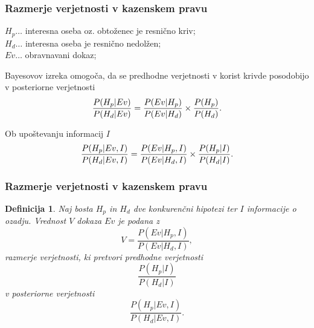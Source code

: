 \documentclass{beamer}
\newtheorem{definicija}{Definicija}
\begin{document}
\begin{frame}
    \frametitle{Razmerje verjetnosti v kazenskem pravu}
    $H_p \dots$ interesna oseba oz. obtoženec je resnično kriv;\\
    $H_d \dots$ interesna oseba je resnično nedolžen;\\
    $Ev \dots$ obravnavani dokaz;\\
    \begin{block}{Bayesovov izreka omogoča, da se predhodne verjetnosti v korist krivde posodobijo v posteriorne verjetnosti}
        \[
            \frac{P(H_p \lvert Ev)}{P(H_d \lvert Ev)} = \frac{P(Ev \lvert H_p)}{P(Ev \lvert H_d)} \times \frac{P(H_p)}{P(H_d)}. \vspace{2mm}
        \]
    \end{block}\vspace{2mm}
    \begin{block}{Ob upoštevanju informacij $I$}
        \[
            \frac{P(H_p \lvert Ev, I)}{P(H_d \lvert Ev, I)} = \frac{P(Ev \lvert H_p, I)}{P(Ev \lvert H_d, I)} \times \frac{P(H_p \lvert I)}{P(H_d \lvert I)}. \vspace{2mm}
        \]
    \end{block}
\end{frame}

\begin{frame}
    \frametitle{Razmerje verjetnosti v kazenskem pravu}
    \begin{definicija}
        Naj bosta  $H_p$ in $H_d$ dve konkurenčni hipotezi ter $I$ informacije o ozadju. Vrednost $V$ dokaza $Ev$ je podana z
        \[
            V = \frac{P(Ev \lvert H_p, I)}{P(Ev \lvert H_d, I)},
        \]
        razmerje verjetnosti, ki pretvori predhodne verjetnosti
        \[
            \frac{P(H_p \lvert I)}{P(H_d \lvert I)} 
        \]
        v posteriorne verjetnosti
        \[
            \frac{P(H_p \lvert Ev, I)}{P(H_d \lvert Ev, I)}.
        \]
     \end{definicija}     
\end{frame}
\end{document}
